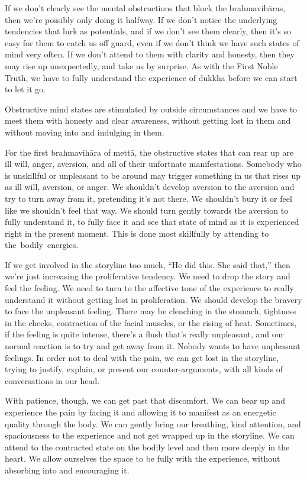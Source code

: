 If we don't clearly see the mental obstructions that block the brahmavihāras, then we're possibly only doing it halfway. If we don't notice the underlying tendencies that lurk as potentials, and if we don't see them clearly, then it's so easy for them to catch us off guard, even if we don't think we have such states of mind very often. If we don't attend to them with clarity and honesty, then they may rise up unexpectedly, and take us by surprise. As with the First Noble Truth, we have to fully understand the experience of dukkha before we can start to let it go.

Obstructive mind states are stimulated by outside circumstances and we have to meet them with honesty and clear awareness, without getting lost in them and without moving into and indulging in them.

For the first brahmavihāra of mettā, the obstructive states that can rear up are ill will, anger, aversion, and all of their unfortnate manifestations. Somebody who is unskillful or unpleasant to be around may trigger something in us that rises up as ill will, aversion, or anger. We shouldn't develop aversion to the aversion and try to turn away from it, pretending it's not there. We shouldn't bury it or feel like we shouldn't feel that way. We should turn gently towards the aversion to fully understand it, to fully face it and see that state of mind as it is experienced right in the present moment. This is done most skillfully by attending to \mbox{the bodily energies.}

If we get involved in the storyline too much, ``He did this. She said that,'' then we're just increasing the proliferative tendency. We need to drop the story and feel the feeling. We need to turn to the affective tone of the experience to really understand it without getting lost in proliferation. We should develop the bravery to face the unpleasant feeling. There may be clenching in the stomach, tightness in the cheeks, contraction of the facial muscles, or the rising of heat. Sometimes, if the feeling is quite intense, there's a flush that's really unpleasant, and our normal reaction is to try and get away from it. Nobody wants to have unpleasant feelings. In order not to deal with the pain, we can get lost in the storyline, trying to justify, explain, or present our counter-arguments, with all kinds of conversations in our head.

With patience, though, we can get past that discomfort. We can bear up and experience the pain by facing it and allowing it to manifest as an energetic quality through the body. We can gently bring our breathing, kind attention, and spaciousness to the experience and not get wrapped up in the storyline. We can attend to the contracted state on the bodily level and then more deeply in the heart. We allow ourselves the space to be fully with the experience, without absorbing into and encouraging it.

